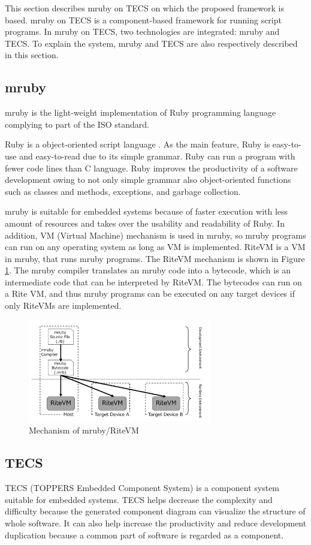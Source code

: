 \documentclass[conference,compsoc]{IEEEtran}
\begin{document}
This section describes mruby on TECS on which the proposed framework is based.
mruby on TECS is a component-based framework for running script programs.
In mruby on TECS, two technologies are integrated: mruby and TECS.
To explain the system, mruby and TECS are also respectively described in this section.

\subsection{mruby}
\label{sec:mruby}
mruby is the light-weight implementation of Ruby programming language complying to part of the ISO standard.

Ruby is a object-oriented script language \cite{url:Ruby}.
As the main feature, Ruby is easy-to-use and easy-to-read due to its simple grammar.
Ruby can run a program with fewer code lines than C language.
Ruby improves the productivity of a software development owing to not only simple grammar also object-oriented functions such as classes and methods, exceptions, and garbage collection.

mruby is suitable for embedded systems because of faster execution with less amount of resources and takes over the usability and readability of Ruby.
In addition, VM (Virtual Machine) mechanism is used in mruby, so mruby programs can run on any operating system as long as VM is implemented.
RiteVM is a VM in mruby, that runs mruby programs.
The RiteVM mechanism is shown in Figure \ref{fig:mruby}.
The mruby compiler translates an mruby code into a bytecode, which is an intermediate code that can be interpreted by RiteVM.
The bytecodes can run on a Rite VM, and thus mruby programs can be executed on any target devices if only RiteVMs are implemented.
\begin{figure}[t]
    \centering
    \includegraphics[width=8cm,clip]{figure/mruby.pdf}
    \caption{Mechanism of mruby/RiteVM}
    \label{fig:mruby}
\end{figure}

\subsection{TECS}
\label{sec:TECS}
TECS (TOPPERS Embedded Component System) is a component system suitable for embedded systems.
TECS helps decrease the complexity and difficulty because the generated component diagram can visualize the structure of whole software.
It can also help increase the productivity and reduce development duplication  because a common part of software is regarded as a component.
\end{document}
